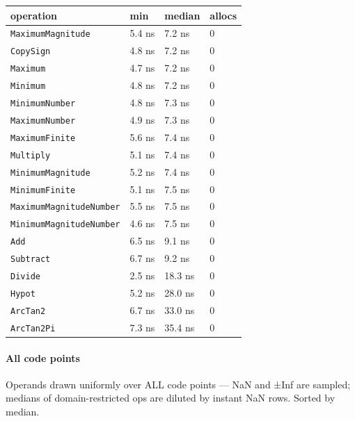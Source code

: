 \begin{table}[h]
\centering
\nopagebreak[3]
\begin{tabulary}{\linewidth}{L L L L}
\toprule
operation & min & median & allocs \\
\toprule
\texttt{MaximumMagnitude} & 5.4 ns & 7.2 ns & 0 \\
\texttt{CopySign} & 4.8 ns & 7.2 ns & 0 \\
\texttt{Maximum} & 4.7 ns & 7.2 ns & 0 \\
\texttt{Minimum} & 4.8 ns & 7.2 ns & 0 \\
\texttt{MinimumNumber} & 4.8 ns & 7.3 ns & 0 \\
\texttt{MaximumNumber} & 4.9 ns & 7.3 ns & 0 \\
\texttt{MaximumFinite} & 5.6 ns & 7.4 ns & 0 \\
\texttt{Multiply} & 5.1 ns & 7.4 ns & 0 \\
\texttt{MinimumMagnitude} & 5.2 ns & 7.4 ns & 0 \\
\texttt{MinimumFinite} & 5.1 ns & 7.5 ns & 0 \\
\texttt{MaximumMagnitudeNumber} & 5.5 ns & 7.5 ns & 0 \\
\texttt{MinimumMagnitudeNumber} & 4.6 ns & 7.5 ns & 0 \\
\texttt{Add} & 6.5 ns & 9.1 ns & 0 \\
\texttt{Subtract} & 6.7 ns & 9.2 ns & 0 \\
\texttt{Divide} & 2.5 ns & 18.3 ns & 0 \\
\texttt{Hypot} & 5.2 ns & 28.0 ns & 0 \\
\texttt{ArcTan2} & 6.7 ns & 33.0 ns & 0 \\
\texttt{ArcTan2Pi} & 7.3 ns & 35.4 ns & 0 \\
\bottomrule
\end{tabulary}

\end{table}



\paragraph{All code points}\indent



\label{11499910499181378231}{}


Operands drawn uniformly over ALL code points — NaN and ±Inf are sampled; medians of domain-restricted ops are diluted by instant NaN rows. Sorted by median.




